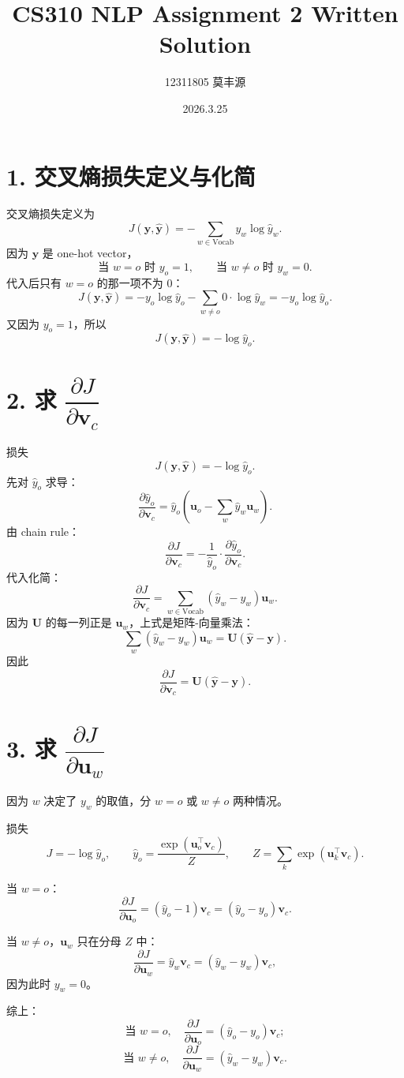 \documentclass[12pt,a4paper]{ctexart}
\title{CS310 NLP Assignment 2 Written Solution}
\author{12311805 莫丰源}
\date{2026.3.25}
\begin{document}
\maketitle

\section*{1. 交叉熵损失定义与化简}
交叉熵损失定义为
\[
J(\bm{y},\hat{\bm{y}})=-\sum_{w\in \mathrm{Vocab}} y_w\log\hat{y}_w.
\]
因为 $\bm{y}$ 是 one-hot vector，
\[
\text{当 } w=o \text{ 时 } y_o=1,\qquad
\text{当 } w\neq o \text{ 时 } y_w=0.
\]
代入后只有 $w=o$ 的那一项不为 0：
\[
J(\bm{y},\hat{\bm{y}})
=-y_o\log\hat{y}_o-\sum_{w\neq o}0\cdot\log\hat{y}_w
=-y_o\log\hat{y}_o.
\]
又因为 $y_o=1$，所以
\[
J(\bm{y},\hat{\bm{y}})=-\log\hat{y}_o.
\]

\section*{2. 求 $\dfrac{\partial J}{\partial \bm{v}_c}$}
损失
\[
J(\bm{y},\hat{\bm{y}})=-\log\hat{y}_o.
\]
先对 $\hat{y}_o$ 求导：
\[
\frac{\partial \hat{y}_o}{\partial \bm{v}_c}
=\hat{y}_o\left(\bm{u}_o-\sum_w \hat{y}_w\bm{u}_w\right).
\]
由 chain rule：
\[
\frac{\partial J}{\partial \bm{v}_c}
=-\frac{1}{\hat{y}_o}\cdot\frac{\partial \hat{y}_o}{\partial \bm{v}_c}.
\]
代入化简：
\[
\frac{\partial J}{\partial \bm{v}_c}
=\sum_{w\in \mathrm{Vocab}}(\hat{y}_w-y_w)\bm{u}_w.
\]
因为 $\bm{U}$ 的每一列正是 $\bm{u}_w$，上式是矩阵-向量乘法：
\[
\sum_w(\hat{y}_w-y_w)\bm{u}_w=\bm{U}(\hat{\bm{y}}-\bm{y}).
\]
因此
\[
\frac{\partial J}{\partial \bm{v}_c}=\bm{U}(\hat{\bm{y}}-\bm{y}).
\]

\section*{3. 求 $\dfrac{\partial J}{\partial \bm{u}_w}$}
因为 $w$ 决定了 $y_w$ 的取值，分 $w=o$ 或 $w\neq o$ 两种情况。

损失
\[
J=-\log\hat{y}_o,
\qquad
\hat{y}_o=\frac{\exp(\bm{u}_o^{\top}\bm{v}_c)}{Z},
\qquad
Z=\sum_k\exp(\bm{u}_k^{\top}\bm{v}_c).
\]

当 $w=o$：
\[
\frac{\partial J}{\partial \bm{u}_o}
=(\hat{y}_o-1)\bm{v}_c
=(\hat{y}_o-y_o)\bm{v}_c.
\]

当 $w\neq o$，$\bm{u}_w$ 只在分母 $Z$ 中：
\[
\frac{\partial J}{\partial \bm{u}_w}
=\hat{y}_w\bm{v}_c
=(\hat{y}_w-y_w)\bm{v}_c,
\]
因为此时 $y_w=0$。

综上：
\[
\text{当 } w=o,\quad
\frac{\partial J}{\partial \bm{u}_o}=(\hat{y}_o-y_o)\bm{v}_c;
\]
\[
\text{当 } w\neq o,\quad
\frac{\partial J}{\partial \bm{u}_w}=(\hat{y}_w-y_w)\bm{v}_c.
\]
\end{document}
